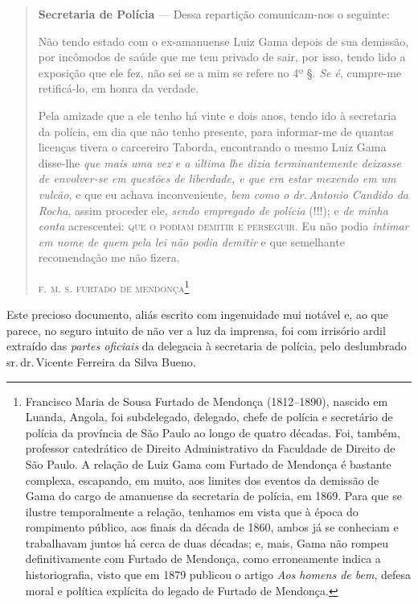 \begin{quote}
\textbf{Secretaria de Polícia} --- Dessa repartição comunicam-nos o
seguinte:

Não tendo estado com o ex-amanuense Luiz Gama depois de sua demissão,
por incômodos de saúde que me tem privado de sair, por isso, tendo lido
a exposição que ele fez, não sei se a mim se refere no 4º §. \emph{Se
é}, cumpre-me retificá-lo, em honra da verdade.

Pela amizade que a ele tenho há vinte e dois anos, tendo ido à
secretaria da polícia, em dia que não tenho presente, para informar-me
de quantas licenças tivera o carcereiro Taborda, encontrando o mesmo
Luiz Gama disse-lhe \emph{que mais uma vez e a última lhe dizia
terminantemente deixasse de envolver-se em questões de liberdade, e que
era estar mexendo em um vulcão,} e que eu achava inconveniente\emph{,
bem como o dr.\,Antonio Candido da Rocha}, assim proceder ele,
\emph{sendo empregado de polícia} (!!!); e \emph{de minha conta}
acrescentei: \textsc{que o podiam demitir e perseguir}. Eu não podia
\emph{intimar em nome de quem pela lei não podia demitir} e que
semelhante recomendação me não fizera.\medskip

\hfill\textsc{f. m. s. furtado de mendonça}\footnote{Francisco Maria de Sousa
  Furtado de Mendonça (1812--1890), nascido em Luanda, Angola, foi
  subdelegado, delegado, chefe de polícia e secretário de polícia da
  província de São Paulo ao longo de quatro décadas. Foi, também,
  professor catedrático de Direito Administrativo da Faculdade de
  Direito de São Paulo. A relação de Luiz Gama com Furtado de Mendonça é
  bastante complexa, escapando, em muito, aos limites dos eventos da
  demissão de Gama do cargo de amanuense da secretaria de polícia, em
  1869. Para que se ilustre temporalmente a relação, tenhamos em vista
  que à época do rompimento público, aos finais da década de 1860, ambos
  já se conheciam e trabalhavam juntos há cerca de duas décadas; e,
  mais, Gama não rompeu definitivamente com Furtado de Mendonça, como
  erroneamente indica a historiografia, visto que em 1879 publicou o
  artigo \emph{Aos homens de bem}, defesa moral e política explícita do
  legado de Furtado de Mendonça.}
\end{quote}  

Este precioso documento, aliás escrito com ingenuidade mui notável e, ao
que parece, no seguro intuito de não ver a luz da imprensa, foi com
irrisório ardil extraído das \emph{partes oficiais} da delegacia à
secretaria de polícia, pelo deslumbrado sr.\,dr.\,Vicente Ferreira da
Silva Bueno.

